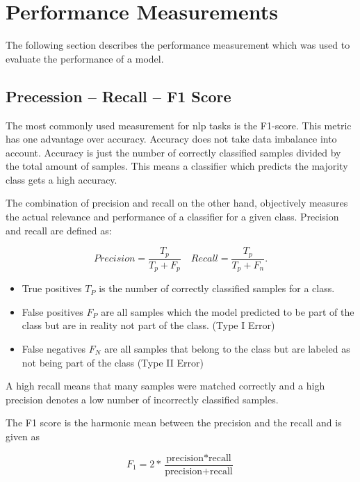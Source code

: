 \section{Performance Measurements}
The following section describes the performance measurement which was used to evaluate the performance of a model.


\subsection{Precession -- Recall -- F1 Score}
The most commonly used measurement for \gls{nlp} tasks is the F1-score. This metric has one advantage over accuracy. Accuracy does not take data imbalance into account. Accuracy is just the number of correctly classified samples divided by the total amount of samples. This means a classifier which predicts the majority class gets a high accuracy.
\medskip

The combination of precision and recall on the other hand, objectively measures the actual relevance and performance of a classifier for a given class. Precision and recall are defined as:

\begin{equation}
Precision = \frac{T_p}{T_p+F_p} \quad Recall = \frac{T_p}{T_p+F_n}.
\end{equation}

\begin{itemize}
    \item True positives $T_P$ is the number of correctly classified samples for a class.
    \item False positives $F_P$ are all samples which the model predicted to be part of the class but are in reality not part of the class. {(Type I Error)}
    \item False negatives $F_N$ are all samples that belong to the class but are labeled as not being part of the class {(Type II Error)}
\end{itemize}

A high recall means that many samples were matched correctly and a high precision denotes a low number of incorrectly classified samples.
\medskip

The F1 score is the harmonic mean between the precision and the recall and is given as

\begin{equation}
    F_1 = 2 * \frac{\text{precision}*\text{recall}}{\text{precision}+\text{recall}}
\label{eq:03_f1}
\end{equation}

